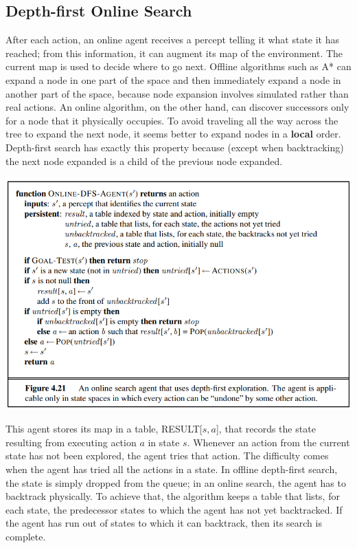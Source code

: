 \subsection{Depth-first Online Search}
After each action, an online agent receives a percept telling it what state it has reached; from this information, it can augment its map of the environment. The current map is used to decide where to go next. Offline algorithms such as A* can expand a node in one part of the space and then immediately expand a node in another part of the space, because node expansion involves simulated rather than real actions. An online algorithm, on the other hand, can discover successors only for a node that it physically occupies. To avoid traveling all the way across the tree to expand the next node, it seems better to expand nodes in a \textbf{local} order.
\newline\newline
Depth-first search has exactly this property because (except when backtracking) the next node expanded is a child of the previous node expanded.
\begin{center}
    \includegraphics[]{images/online-dfs.png}
\end{center}
This agent stores its map in a table, RESULT[$s, a$], that records the state resulting from executing action $a$ in state $s$. Whenever an action from the current state has not been explored, the agent tries that action. The difficulty comes when the agent has tried all the actions in a state. In offline depth-first search, the state is simply dropped from the queue; in an online search, the agent has to backtrack physically. To achieve that, the algorithm keeps a table that lists, for each state, the predecessor states to which the agent has not yet backtracked. If the agent has run out of states to which it can backtrack, then its search is complete.

